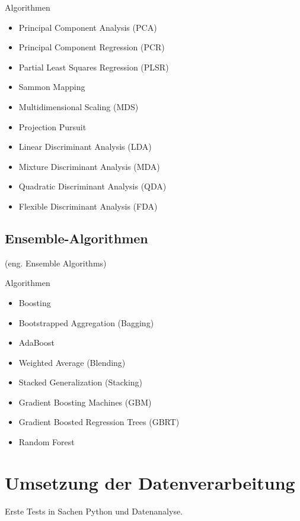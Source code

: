 Algorithmen
\begin{itemize}
	\item Principal Component Analysis (PCA)
	\item Principal Component Regression (PCR)
	\item Partial Least Squares Regression (PLSR)
	\item Sammon Mapping
	\item Multidimensional Scaling (MDS)
	\item Projection Pursuit
	\item Linear Discriminant Analysis (LDA)
	\item Mixture Discriminant Analysis (MDA)
	\item Quadratic Discriminant Analysis (QDA)
	\item Flexible Discriminant Analysis (FDA)
\end{itemize}

\subsection{Ensemble-Algorithmen}
(eng. Ensemble Algorithms)\vspace{0.2cm}

Algorithmen
\begin{itemize}
	\item Boosting
	\item Bootstrapped Aggregation (Bagging)
	\item AdaBoost
	\item Weighted Average (Blending)
	\item Stacked Generalization (Stacking)
	\item Gradient Boosting Machines (GBM)
	\item Gradient Boosted Regression Trees (GBRT)
	\item Random Forest
\end{itemize}

\section{Umsetzung der Datenverarbeitung}
Erste Tests in Sachen Python und Datenanalyse.

